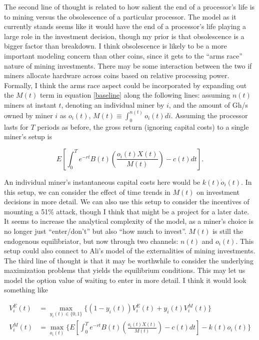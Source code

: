 \documentclass[12pt]{article}
\begin{document}
The second line of thought is related to how salient the end of a processor's life is to mining versus the obsolescence of a particular processor. The model as it currently stands seems like it would have the end of a processor's life playing a large role in the investment decision, though my prior is that obsolescence is a bigger factor than breakdown. I think obsolescence is likely to be a more important modeling concern than other coins, since it gets to the ``arms race'' nature of mining investments. There may be some interaction between the two if miners allocate hardware across coins based on relative processing power. Formally, I think the arms race aspect could be incorporated by expanding out the $M(t)$ term in equation \ref{baseline} along the following lines:  assuming $n(t)$ miners at instant $t$, denoting an individual miner by $i$, and the amount of Gh/s owned by miner $i$ as $o_i(t)$, $M(t) \equiv \int_0^{n(t)} o_i(t) di $. Assuming the processor lasts for $T$ periods as before, the gross return (ignoring capital costs) to a single miner's setup is

\[ E \left [ \int_0^T e^{-rt} B(t) \left ( \frac{o_i(t) X(t)}{M(t)} \right ) - c(t) dt \right ] .\]

An individual miner's instantaneous capital costs here would be $k(t)\dot{o}_i(t)$. In this setup, we can consider the effect of time trends in $M(t)$ on investment decisions in more detail. We can also use this setup to consider the incentives of mounting a 51\% attack, though I think that might be a project for a later date. It seems to increase the analytical complexity of the model, as a miner's choice is no longer just ``enter/don't'' but also ``how much to invest''. $M(t)$ is still the endogenous equilibriator, but now through two channels: $n(t)$ and $o_i(t)$. This setup could also connect to Ali's model of the externalities of mining investments. \\

The third line of thought is that it may be worthwhile to consider the underlying maximization problems that yields the equilibrium conditions. This may let us model the option value of waiting to enter in more detail. I think it would look something like

\begin{align}
\label{entry}
V^E_i(t) &= \max_{y_{i}(t) \in \{0,1\}} \{ (1-y_i(t)) V^E_i(t) + y_i(t)  V^M_i(t)  \} \\
\label{investment}
V^M_i(t) &= \max_{o_i(t)} \{ E \left [ \int_0^T e^{-rt} B(t) \left ( \frac{o_i(t) X(t)}{M(t)} \right ) - c(t) dt \right ] - k(t)o_i(t) \}
\end{align}
\end{document}
